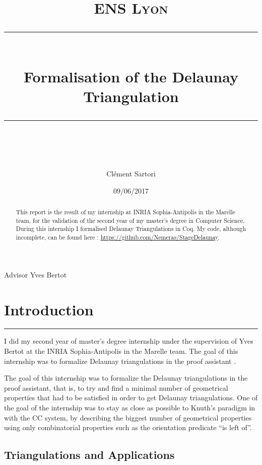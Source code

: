 \documentclass[a4paper,10pt]{article}
\title{
\normalfont \normalsize 
\textsc{ENS Lyon} \\
[10pt] 
\rule{\linewidth}{0.5pt} \\[6pt] 
\huge Formalisation of the Delaunay Triangulation \\
\rule{\linewidth}{2pt}  \\[10pt]
}
\author{Clément Sartori}
\date{\normalsize 09/06/2017}
\begin{document}
\maketitle
\noindent
Advisor \dotfill Yves Bertot \\


\maketitle

\begin{abstract}
  This report is the result of my internship at INRIA Sophia-Antipolis in the Marelle team, for the validation of the second year of my master's degree in Computer Science. During this internship I formalised Delaunay Triangulations in Coq. My code, although incomplete, can be found here : \href{https://github.com/Nemeras/StageDelaunay}{https://github.com/Nemeras/StageDelaunay}.
\end{abstract}

\tableofcontents{}

\newpage

\section{Introduction}
\rule{\linewidth}{0.5pt}

I did my second year of master's degree internship under the supervision of Yves Bertot at the INRIA Sophia-Antipolis in the Marelle team. The goal of this internship was to formalize Delaunay triangulations in the proof assistant {}.

The goal of this internship was to formalize the Delaunay triangulations in the {} proof assistant, that is, to try and find a minimal number of geometrical properties that had to be satisfied in order to get Delaunay triangulations. One of the goal of the internship was to stay as close as possible to Knuth's paradigm in \cite{Knuth92} with the CC system, by describing the biggest number of geometrical properties using only combinatorial properties such as the orientation predicate ``is left of''.

\subsection{Triangulations and Applications}
\end{document}
